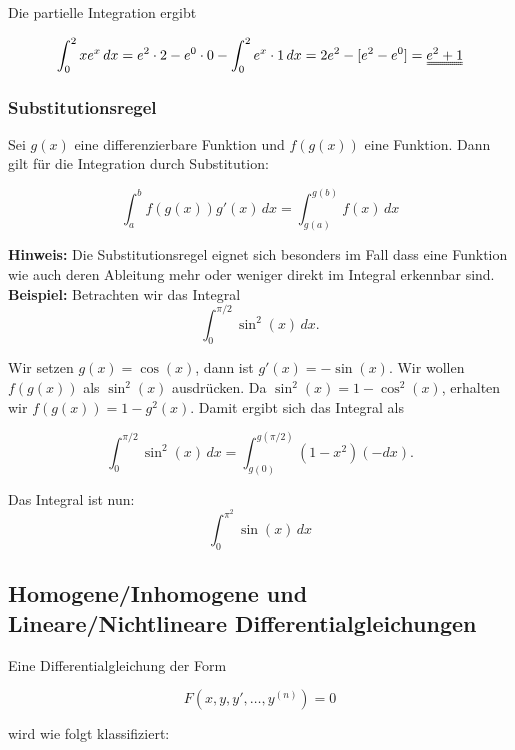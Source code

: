 \documentclass[11pt, openany]{book}
\begin{document}
Die partielle Integration ergibt 

\[
\int_0^2 xe^x \, dx = e^2 \cdot 2 - e^0 \cdot 0 - \int_0^2 e^x \cdot 1 \,dx = 2e^2 -[e^2 - e^0] = \uuline{e^2 + 1}
\]
\newpage

\subsubsection{Substitutionsregel}
Sei $g(x)$ eine differenzierbare Funktion und $f(g(x))$ eine Funktion. Dann gilt für die Integration durch Substitution:
\begin{tcolorbox}
\[
\int_a^b f(g(x))g'(x) \, dx = \int_{g(a)}^{g(b)} f(x) \, dx
\]   
\end{tcolorbox}


\textbf{Hinweis:}
Die Substitutionsregel eignet sich besonders im Fall dass eine Funktion wie auch deren Ableitung mehr oder weniger direkt im Integral erkennbar sind. \\
\textbf{Beispiel:}
Betrachten wir das Integral
\[
\int_0^{\pi/2} \sin^2(x) \, dx.
\]

Wir setzen $g(x) = \cos(x)$, dann ist $g'(x) = -\sin(x)$. Wir wollen $f(g(x))$ als $\sin^2(x)$ ausdrücken. Da $\sin^2(x) = 1 - \cos^2(x)$, erhalten wir $f(g(x)) = 1 - g^2(x)$. Damit ergibt sich das Integral als

\[
\int_0^{\pi/2} \sin^2(x) \, dx = \int_{g(0)}^{g(\pi/2)} (1 - x^2) (-dx).
\]


Das Integral ist nun:
\[
\int_0^{\pi^2} \sin(x) \, dx
\]

\subsection{Homogene/Inhomogene und Lineare/Nichtlineare Differentialgleichungen}
Eine Differentialgleichung der Form

\[ F(x, y, y', \dots, y^{(n)}) = 0 \]

wird wie folgt klassifiziert:
\end{document}
